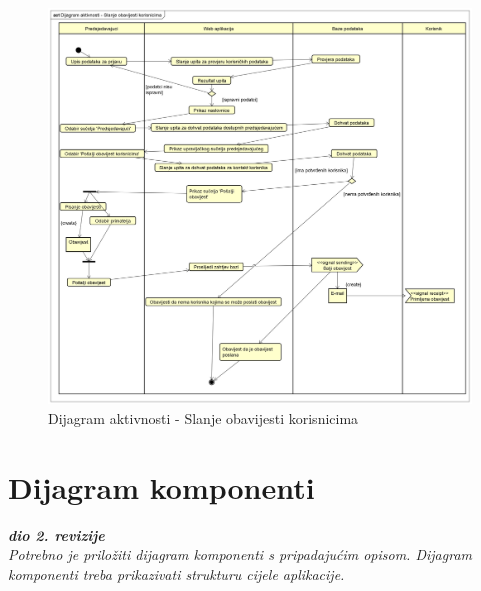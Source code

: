 			 \begin{figure}[H]
			 	\includegraphics[width= 15 cm, height= 25 cm, keepaspectratio]{dijagrami/Dijagram aktivnosti - Slanje obavijesti korisnicima.png} 
			 	\centering
			 	\caption{Dijagram aktivnosti - Slanje obavijesti korisnicima}
			 	\label{fig:act4}
			 \end{figure}
			 
			 \eject
			
			\eject
		\section{Dijagram komponenti}
		
			\textbf{\textit{dio 2. revizije}}\\
		
			 \textit{Potrebno je priložiti dijagram komponenti s pripadajućim opisom. Dijagram komponenti treba prikazivati strukturu cijele aplikacije.}